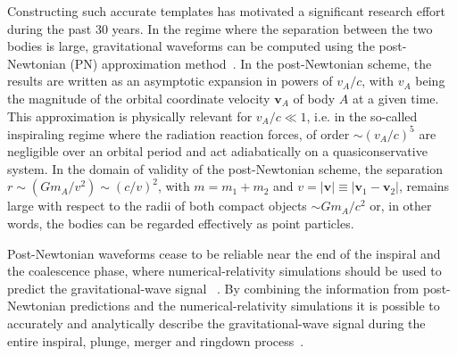 \documentclass[aps, prd,
twocolumn,%
superscriptaddress,
showpacs, nofootinbib, eqsecnum, amsmath, amssymb, floatfix
]{revtex4}
\begin{document}
Constructing such accurate templates has motivated a significant
research effort during the past 30 years. In the regime where the
separation between the two bodies is large, gravitational waveforms
can be computed using the post-Newtonian (PN) approximation
method~\cite{Sasaki:2003xr,
  Blanchet2006, Futamase:2007zz}. In the post-Newtonian scheme, the results
are written as an asymptotic expansion in powers of $v_A/c$, with
$v_A$ being the magnitude of the orbital coordinate velocity
$\bm{v}_A$ of body $A$ at a given time. This approximation is
physically relevant for $v_A/c \ll 1$, i.e. in the so-called
inspiraling regime where the radiation reaction forces, of order
$\sim (v_A/c)^5 $ are negligible over an orbital period and act
adiabatically on a quasiconservative system. In the domain of
validity of the post-Newtonian scheme, the separation $r \sim (G
m_A/v^2)\sim (c/v)^2$, with $m=m_1 + m_2$ and $v = |\bm{v}| \equiv
|\bm{v}_1 - \bm{v}_2 |$, remains large with respect to the radii of
both compact objects $\sim G m_A/c^2$ or, in other words, the bodies
can be regarded effectively as point particles.

Post-Newtonian waveforms cease to be reliable near the end of the inspiral and
the coalescence phase, where numerical-relativity simulations should be used
to predict the gravitational-wave signal ~\cite{Pretorius2005a,
  Campanelli2006a, Baker2006a}. By combining the information from
post-Newtonian predictions and the numerical-relativity simulations it is
possible to accurately and analytically describe the gravitational-wave signal
during the entire inspiral, plunge, merger and ringdown
process~\cite{Buonanno99, Buonanno00, DJS00, Buonanno-Cook-Pretorius:2007,
  Ajith:2008, Damour2009a, Pan:2009wj, Santamaria:2010yb, Pan:2011gk}.
\end{document}
